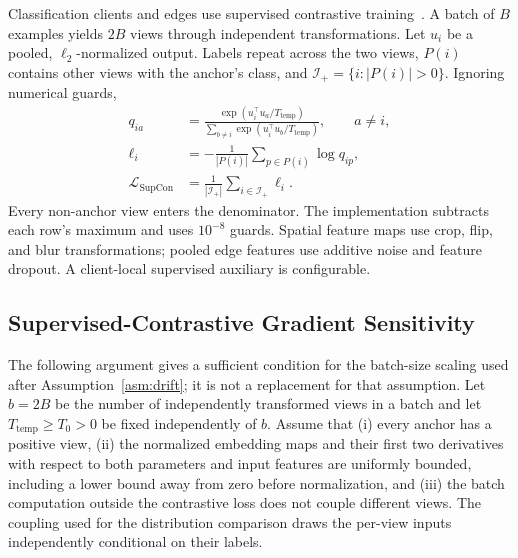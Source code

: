 Classification clients and edges use supervised contrastive training~\cite{khosla2020supervised}. A batch of $B$ examples yields $2B$ views through independent transformations. Let $u_i$ be a pooled, $\ell_2$-normalized output. Labels repeat across the two views, $P(i)$ contains other views with the anchor's class, and $\mathcal I_+=\{i:|P(i)|>0\}$. Ignoring numerical guards,
\begin{equation}
\begin{split}
 q_{ia}
 &=\frac{\exp(u_i^\top u_a/T_{\mathrm{temp}})}
 {\sum_{b\ne i}\exp(u_i^\top u_b/T_{\mathrm{temp}})},
 \qquad a\ne i,\\
 \ell_i
 &=-\frac{1}{|P(i)|}\sum_{p\in P(i)}\log q_{ip},\\
 \mathcal L_{\mathrm{SupCon}}
 &=\frac{1}{|\mathcal I_+|}\sum_{i\in\mathcal I_+}\ell_i.
\end{split}
\label{eq:base_supcon}
\end{equation}
Every non-anchor view enters the denominator. The implementation subtracts each row's maximum and uses $10^{-8}$ guards. Spatial feature maps use crop, flip, and blur transformations; pooled edge features use additive noise and feature dropout. A client-local supervised auxiliary is configurable.

\subsection{Supervised-Contrastive Gradient Sensitivity}
\label{supp:supcon_sensitivity}

The following argument gives a sufficient condition for the batch-size scaling used after Assumption~\ref{asm:drift}; it is not a replacement for that assumption. Let $b=2B$ be the number of independently transformed views in a batch and let $T_{\mathrm{temp}}\ge T_0>0$ be fixed independently of $b$. Assume that (i) every anchor has a positive view, (ii) the normalized embedding maps and their first two derivatives with respect to both parameters and input features are uniformly bounded, including a lower bound away from zero before normalization, and (iii) the batch computation outside the contrastive loss does not couple different views. The coupling used for the distribution comparison draws the per-view inputs independently conditional on their labels.

